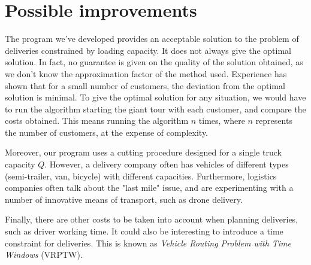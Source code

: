 \chapter{Possible improvements}

The program we've developed provides an acceptable solution to the problem of deliveries constrained by loading capacity. It does not always give the optimal solution. In fact, no guarantee is given on the quality of the solution obtained, as we don't know the approximation factor of the method used. Experience has shown that for a small number of customers, the deviation from the optimal solution is minimal. To give the optimal solution for any situation, we would have to run the algorithm starting the giant tour with each customer, and compare the costs obtained. This means running the algorithm $n$ times, where $n$ represents the number of customers, at the expense of complexity.

Moreover, our program uses a cutting procedure designed for a single truck capacity $Q$. However, a delivery company often has vehicles of different types (semi-trailer, van, bicycle) with different capacities. Furthermore, logistics companies often talk about the "last mile" issue, and are experimenting with a number of innovative means of transport, such as drone delivery.

Finally, there are other costs to be taken into account when planning deliveries, such as driver working time. It could also be interesting to introduce a time constraint for deliveries. This is known as {\it Vehicle Routing Problem with Time Windows} (VRPTW).